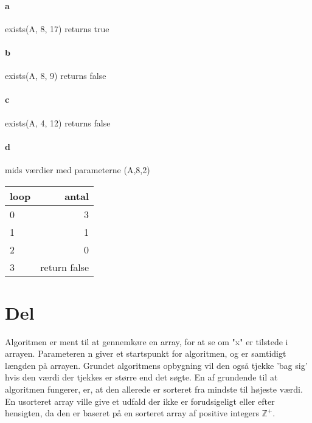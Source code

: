 \documentclass{article}
\begin{document}
\paragraph{a}
exists(A, 8, 17)
\newline
        returns true
\newline

\paragraph{b}
exists(A, 8, 9)
\newline
        returns false\newline

\paragraph{c}
exists(A, 4, 12)
\newline
        returns false \newline


\paragraph{d}

mids værdier med parameterne (A,8,2)\newline
\begin{tabular}{l | r}

	loop & antal \\ \hline
	\hline
	0 &  3 \\ \hline
	1 &  1 \\ \hline
	2 &  0 \\ \hline
	3 &  return false\\
	\hline
\end{tabular}

\section{Del}

Algoritmen er ment til at gennemkøre en array, for at se om "x" er tilstede i arrayen. Parameteren n giver et startspunkt for algoritmen, og er samtidigt længden på arrayen. Grundet algoritmens opbygning vil den også tjekke 'bag sig' hvis den værdi der tjekkes er større end det søgte. En af grundende til at algoritmen fungerer, er, at den allerede er sorteret fra mindste til højeste værdi. En usorteret array ville give et udfald der ikke er forudsigeligt eller efter hensigten, da den er baseret på en sorteret array af positive integers $\mathbb{Z^+}$.
\end{document}
